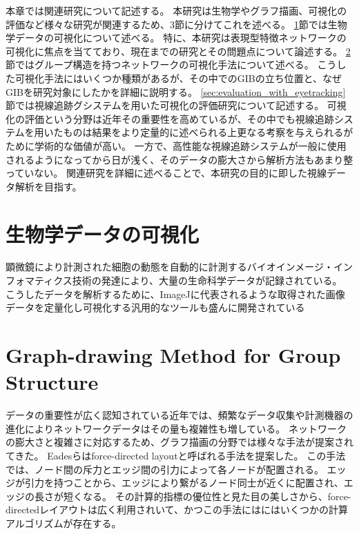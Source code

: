 \documentclass{kuee}
\begin{document}
本章では関連研究について記述する。
本研究は生物学やグラフ描画、可視化の評価など様々な研究が関連するため、3節に分けてこれを述べる。
\ref{sec:vis_bio}節では生物学データの可視化について述べる。
特に、本研究は表現型特徴ネットワークの可視化に焦点を当てており、現在までの研究とその問題点について論述する。
\ref{sec:graph_for_group_structure}節ではグループ構造を持つネットワークの可視化手法について述べる。
こうした可視化手法にはいくつか種類があるが、その中でのGIBの立ち位置と、なぜGIBを研究対象にしたかを詳細に説明する。
\ref{sec:evaluation_with_eyetracking}節では視線追跡グシステムを用いた可視化の評価研究について記述する。
可視化の評価という分野は近年その重要性を高めているが、その中でも視線追跡システムを用いたものは結果をより定量的に述べられる上更なる考察を与えられるがために学術的な価値が高い。
一方で、高性能な視線追跡システムが一般に使用されるようになってから日が浅く、そのデータの膨大さから解析方法もあまり整っていない。
関連研究を詳細に述べることで、本研究の目的に即した視線データ解析を目指す。

\section{生物学データの可視化}
\label{sec:vis_bio}
顕微鏡により計測された細胞の動態を自動的に計測するバイオインメージ・インフォマティクス技術の発達により、大量の生命科学データが記録されている。
こうしたデータを解析するために、ImageJ\cite{schneider2012nih}に代表されるような取得された画像データを定量化し可視化する汎用的なツールも盛んに開発されている\cite{schindelin2012fiji,carpenter2006cellprofiler,Chen491035}

\section{Graph-drawing Method for Group Structure}
\label{sec:graph_for_group_structure}
データの重要性が広く認知されている近年では、頻繁なデータ収集や計測機器の進化によりネットワークデータはその量も複雑性も増している。
ネットワークの膨大さと複雑さに対応するため、グラフ描画の分野では様々な手法が提案されてきた。
Eadesらはforce-directed layoutと呼ばれる手法を提案した\cite{eades84}。
この手法では、ノード間の斥力とエッジ間の引力によって各ノードが配置される。
エッジが引力を持つことから、エッジにより繋がるノード同士が近くに配置され、エッジの長さが短くなる。
その計算的指標の優位性と見た目の美しさから、force-directedレイアウトは広く利用されいて\cite{Kobourov2013ForceDirectedDA}、かつこの手法にはにはいくつかの計算アルゴリズムが存在する\cite{harel2000fast,koren2003drawing,hachul2004drawing}。
\end{document}
